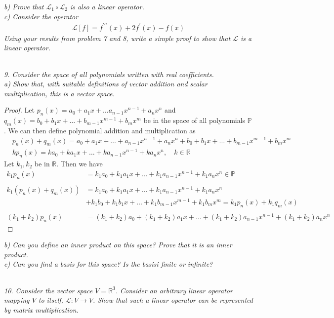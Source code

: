 \documentclass[12pt]{article}
\theoremstyle{remark}
\begin{document}
\textit{b) Prove that $\mathcal{L}_1 \circ \mathcal{L}_2$ is also a linear operator.} \\
\textit{c) Consider the operator}
\begin{align*}
	\mathcal{L}[f] = f^{\prime\prime\prime}(x) + 2f^\prime(x) - f(x)
\end{align*}
\textit{Using your results from problem 7 and 8, write a simple proof to show that $\mathcal{L}$ is a linear operator.} \\ \\

\newpage

\textit{9. Consider the space of all polynomials written with real coefficients.} \\
\textit{a) Show that, with suitable definitions of vector addition and scalar multiplication, this is a vector space.} 

\begin{proof}
Let $p_n(x) = a_0 + a_1x + \ldots a_{n-1}x^{n-1} + a_nx^n$ and $q_m(x) = b_0 + b_1x + \ldots + b_{m-1}x^{m-1} + b_mx^m$ be in the space of all polynomials $\mathbb{P}$. We can then define polynomial addition and multiplication as 
\begin{align*}
	& p_n(x) + q_m(x) = a_0 + a_1x + \ldots + a_{n-1}x^{n-1} + a_nx^n + b_0 + b_1x + \ldots + b_{m-1}x^{m-1} + b_mx^m \\
	& kp_n(x) = ka_0 + ka_1x + \ldots + ka_{n-1}x^{n-1} + ka_nx^n, \quad k \in \mathbb{R}
\end{align*}
Let $k_1,k_2$ be in $\mathbb{R}$. Then we have 
\begin{align*}
	k_1p_n(x) & = k_1a_0 + k_1a_1x + \ldots + k_1a_{n-1}x^{n-1} + k_1a_nx^n \in \mathbb{P} \\ \\
	k_1(p_n(x) + q_m(x)) & = k_1a_0 + k_1a_1x + \ldots + k_1a_{n-1}x^{n-1} + k_1a_nx^n \\
	& + k_1b_0 + k_1b_1x + \ldots + k_1b_{m-1}x^{m-1} + k_1b_mx^m = k_1p_n(x) + k_1q_m(x) \\ \\	
	(k_1 + k_2)p_n(x) & = (k_1 + k_2)a_0 + (k_1 + k_2)a_1x + \ldots + (k_1 + k_2)a_{n-1}x^{n-1} + (k_1 + k_2)a_nx^n
\end{align*}
\end{proof}

\textit{b) Can you define an inner product on this space? Prove that it is an inner product.} \\
\textit{c) Can you find a basis for this space? Is the basisi finite or infinite?} \\ \\

\newpage

\textit{10. Consider the vector space $V = \mathbb{R}^3$. Consider an arbitrary linear operator mapping $V$ to itself, $\mathcal{L}: V \rightarrow V$. Show that such a linear operator can be represented by matrix multiplication.}
\end{document}
